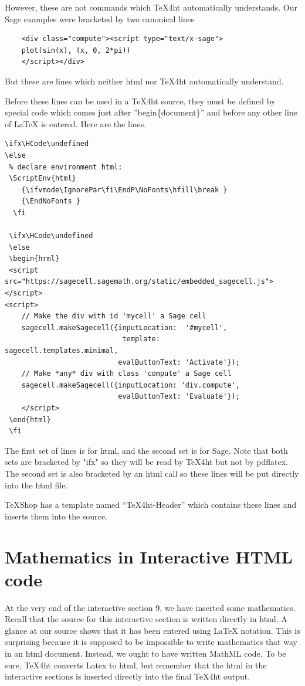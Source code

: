\documentclass[11pt, oneside]{article}   	%
\begin{document}
However, these are not commands which TeX4ht automatically understands. Our Sage examples 
were bracketed by two canonical lines
\begin{verbatim}
    <div class="compute"><script type="text/x-sage">
    plot(sin(x), (x, 0, 2*pi))
    </script></div>
\end{verbatim}
But these are lines which neither html nor TeX4ht automatically understand.

Before these lines can be used in a TeX4ht source, they must be defined by special code which comes just after
''begin\{document\}'' and before any other line of LaTeX is entered. Here are the lines.
\begin{verbatim}
\ifx\HCode\undefined
\else
 % declare environment html:
 \ScriptEnv{html}
    {\ifvmode\IgnorePar\fi\EndP\NoFonts\hfill\break }
    {\EndNoFonts }
  \fi

 \ifx\HCode\undefined
 \else
 \begin{hrml}
 <script src="https://sagecell.sagemath.org/static/embedded_sagecell.js"></script>
<script>
    // Make the div with id 'mycell' a Sage cell
    sagecell.makeSagecell({inputLocation:  '#mycell',
                            template:       sagecell.templates.minimal,
                           evalButtonText: 'Activate'});
    // Make *any* div with class 'compute' a Sage cell
    sagecell.makeSagecell({inputLocation: 'div.compute',
                           evalButtonText: 'Evaluate'});
    </script>
 \end{html}
 \fi
\end{verbatim}

The first set of lines is for html, and the second set is for Sage. Note that both sets are bracketed by "ifx" so they will be read by TeX4ht but not by pdflatex. The second set is also bracketed by an html call so these lines will be put directly into the html file.

TeXShop has a template named ``TeX4ht-Header'' which contains these lines and inserts them into the source.


\section{Mathematics in Interactive HTML code}

At the very end of the interactive section 9, we have inserted some mathematics. Recall that the source for this interactive section is written directly in html. A glance at our source shows that it has been entered using LaTeX notation. This is surprising because it is supposed to be impossible to write mathematics that way in an html document. Instead, we ought to have written MathML code. To be sure, TeX4ht converts Latex to html, but remember that the html in the interactive sections is inserted directly into the final TeX4ht output.
\end{document}
